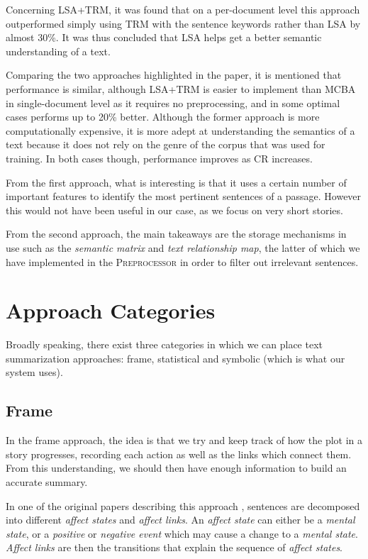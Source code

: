 Concerning LSA+TRM, it was found that on a per-document level this approach outperformed simply using TRM with the sentence keywords rather than LSA by almost 30\%. It was thus concluded that LSA helps get a better semantic understanding of a text.

Comparing the two approaches highlighted in the paper, it is mentioned that performance is similar, although LSA+TRM is easier to implement than MCBA in single-document level as it requires no preprocessing, and in some optimal cases performs up to 20\% better. Although the former approach is more computationally expensive, it is more adept at understanding the semantics of a text because it does not rely on the genre of the corpus that was used for training. In both cases though, performance improves as CR increases.

\mbox{}

From the first approach, what is interesting is that it uses a certain number of important features to identify the most pertinent sentences of a passage. However this would not have been useful in our case, as we focus on very short stories.

From the second approach, the main takeaways are the storage mechanisms in use such as the \textit{semantic matrix} and \textit{text relationship map}, the latter of which we have implemented in the \textsc{Preprocessor} in order to filter out irrelevant sentences.

\section{Approach Categories}
\label{sec:approach_categories}

Broadly speaking, there exist three categories in which we can place text summarization approaches: frame, statistical and symbolic (which is what our system uses).

\subsection{Frame}

In the frame approach, the idea is that we try and keep track of how the plot in a story progresses, recording each action as well as the links which connect them. From this understanding, we should then have enough information to build an accurate summary.

\mbox{}

In one of the original papers describing this approach \cite{lehnert_1980_nodate}, sentences are decomposed into different \textit{affect states} and \textit{affect links}. An \textit{affect state} can either be a \textit{mental state}, or a \textit{positive} or \textit{negative event} which may cause a change to a \textit{mental state}. \textit{Affect links} are then the transitions that explain the sequence of \textit{affect states}.

